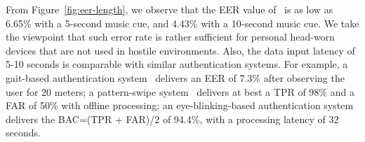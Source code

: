 From Figure~\ref{fig:eer-length}, we observe that the EER value of \systemname~is as low as 6.65\% with a 5-second music cue, and 4.43\% with a 10-second music cue. We take the viewpoint that such error rate is rather sufficient for personal head-worn devices that are not used in hostile environments. Also, the data input latency of 5-10 seconds is comparable with similar authentication systems. For example, a gait-based authentication system~\cite{gafurov2006biometric} delivers an EER of 7.3\% after observing the user for 20 meters;
a pattern-swipe system~\cite{de2012touch} delivers at best a TPR of 98\% and a FAR of 50\%  with offline processing; an eye-blinking-based authentication system~\cite{rogers2015approach} delivers the BAC=(TPR + FAR)/2 of 94.4\%, with a processing latency of 32 seconds.
%






